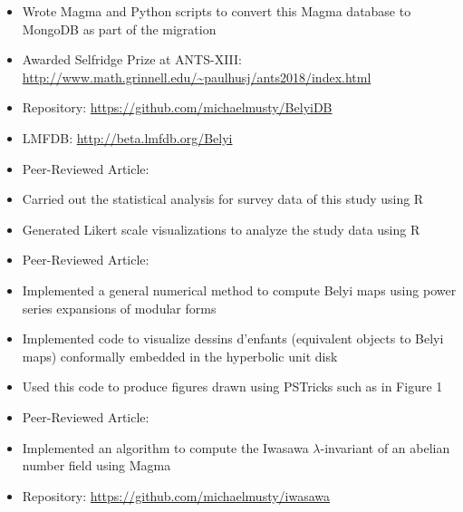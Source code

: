 \documentclass[a4paper]{adcv}
\begin{document}
{\begin{adcvtabletwo}
\begin{itemize}
        \item
          Wrote Magma and Python scripts to convert this Magma database
          to MongoDB as part of the migration
        \item
          Awarded Selfridge Prize at ANTS-XIII:
          \url{http://www.math.grinnell.edu/~paulhusj/ants2018/index.html}
        \item
          Repository: \url{https://github.com/michaelmusty/BelyiDB}
        \item
          LMFDB: \url{http://beta.lmfdb.org/Belyi}
        \item
          Peer-Reviewed Article: \cite{ants}
      \end{itemize}
    \adcvrowskip
      \vspace{-10pt}
      \begin{itemize}
        \item
          Carried out the statistical analysis for survey data of this study
          using R
        \item
          Generated Likert scale visualizations to analyze the study data
          using R
        \item
          Peer-Reviewed Article: \cite{aaron}
      \end{itemize}
    \adcvrowskip
      \vspace{-10pt}
      \begin{itemize}
        \item
          Implemented a general numerical method to compute
          Belyi maps using power series expansions of modular forms
        \item
          Implemented code to visualize dessins d'enfants
          (equivalent objects to Belyi maps) conformally embedded in
          the hyperbolic unit disk
        \item
          Used this code to produce figures drawn using PSTricks
          such as in Figure 1
        \item
          Peer-Reviewed Article: \cite{belyi}
      \end{itemize}
    \adcvrowskip
      \vspace{-10pt}
      \begin{itemize}
        \item
          Implemented an algorithm to compute the Iwasawa
          $\lambda$-invariant of an abelian number field using Magma
        \item
          Repository: \url{https://github.com/michaelmusty/iwasawa}
      \end{itemize}
  \end{adcvtabletwo}
}
\end{document}
